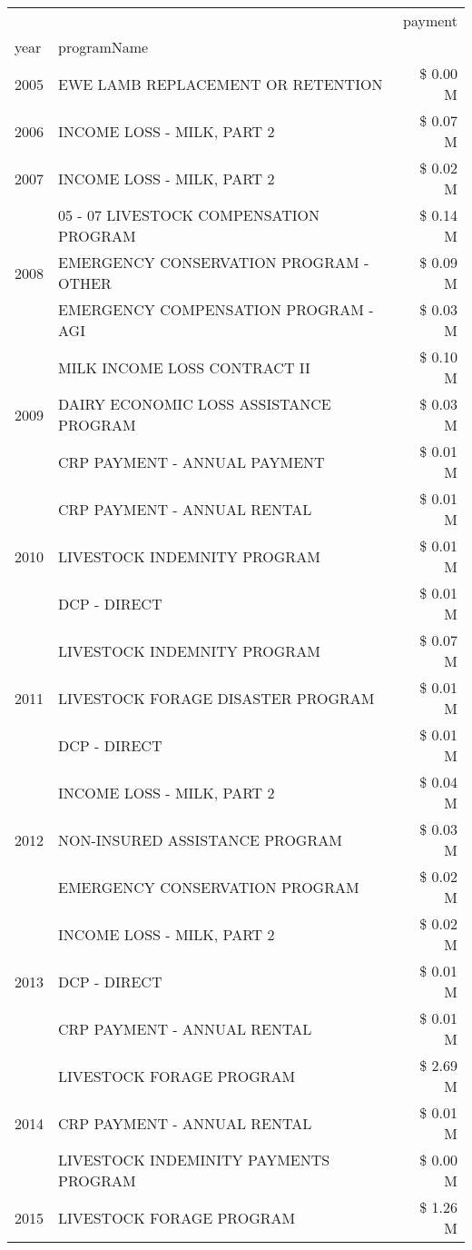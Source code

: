 \begin{tabular}{llr}
\toprule
 &  & payment \\
year & programName &  \\
\midrule
2005 & EWE LAMB REPLACEMENT OR RETENTION & \$ 0.00 M \\
\cline{1-3}
2006 & INCOME LOSS - MILK, PART 2 & \$ 0.07 M \\
\cline{1-3}
2007 & INCOME LOSS - MILK, PART 2 & \$ 0.02 M \\
\cline{1-3}
\multirow[t]{3}{*}{2008} & 05 - 07 LIVESTOCK COMPENSATION PROGRAM & \$ 0.14 M \\
 & EMERGENCY CONSERVATION PROGRAM - OTHER & \$ 0.09 M \\
 & EMERGENCY COMPENSATION PROGRAM - AGI & \$ 0.03 M \\
\cline{1-3}
\multirow[t]{3}{*}{2009} & MILK INCOME LOSS CONTRACT II & \$ 0.10 M \\
 & DAIRY ECONOMIC LOSS ASSISTANCE PROGRAM & \$ 0.03 M \\
 & CRP PAYMENT - ANNUAL PAYMENT & \$ 0.01 M \\
\cline{1-3}
\multirow[t]{3}{*}{2010} & CRP PAYMENT - ANNUAL RENTAL & \$ 0.01 M \\
 & LIVESTOCK INDEMNITY PROGRAM & \$ 0.01 M \\
 & DCP - DIRECT & \$ 0.01 M \\
\cline{1-3}
\multirow[t]{3}{*}{2011} & LIVESTOCK INDEMNITY PROGRAM & \$ 0.07 M \\
 & LIVESTOCK FORAGE DISASTER PROGRAM & \$ 0.01 M \\
 & DCP - DIRECT & \$ 0.01 M \\
\cline{1-3}
\multirow[t]{3}{*}{2012} & INCOME LOSS - MILK, PART 2 & \$ 0.04 M \\
 & NON-INSURED ASSISTANCE PROGRAM & \$ 0.03 M \\
 & EMERGENCY CONSERVATION PROGRAM & \$ 0.02 M \\
\cline{1-3}
\multirow[t]{3}{*}{2013} & INCOME LOSS - MILK, PART 2 & \$ 0.02 M \\
 & DCP - DIRECT & \$ 0.01 M \\
 & CRP PAYMENT - ANNUAL RENTAL & \$ 0.01 M \\
\cline{1-3}
\multirow[t]{3}{*}{2014} & LIVESTOCK FORAGE PROGRAM & \$ 2.69 M \\
 & CRP PAYMENT - ANNUAL RENTAL & \$ 0.01 M \\
 & LIVESTOCK INDEMINITY PAYMENTS PROGRAM & \$ 0.00 M \\
\cline{1-3}
\multirow[t]{3}{*}{2015} & LIVESTOCK FORAGE PROGRAM & \$ 1.26 M \\

\end{tabular}
